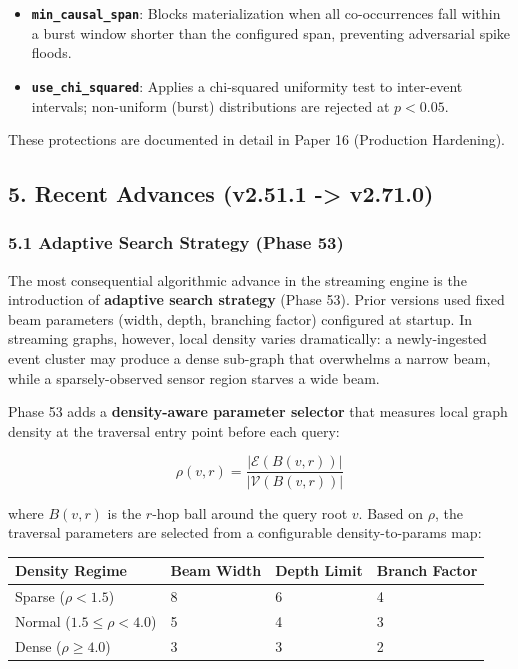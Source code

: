 \begin{itemize}
  \item \textbf{\texttt{min\_causal\_span}}: Blocks materialization when all co-occurrences fall within a burst window shorter than the configured span, preventing adversarial spike floods.
  \item \textbf{\texttt{use\_chi\_squared}}: Applies a chi-squared uniformity test to inter-event intervals; non-uniform (burst) distributions are rejected at $p < 0.05$.
\end{itemize}


These protections are documented in detail in Paper 16 (Production Hardening).

\subsection*{5. Recent Advances (v2.51.1 -> v2.71.0)}

\subsubsection*{5.1 Adaptive Search Strategy (Phase 53)}
The most consequential algorithmic advance in the streaming engine is the introduction of \textbf{adaptive search strategy} (Phase 53). Prior versions used fixed beam parameters (width, depth, branching factor) configured at startup. In streaming graphs, however, local density varies dramatically: a newly-ingested event cluster may produce a dense sub-graph that overwhelms a narrow beam, while a sparsely-observed sensor region starves a wide beam.

Phase 53 adds a \textbf{density-aware parameter selector} that measures local graph density at the traversal entry point before each query:

$$\rho(v, r) = \frac{|\mathcal{E}(B(v,r))|}{|\mathcal{V}(B(v,r))|}$$

where $B(v, r)$ is the $r$-hop ball around the query root $v$. Based on $\rho$, the traversal parameters are selected from a configurable density-to-params map:

\begin{table}[h]
\small\centering
\begin{tabular}{llll}
\toprule
Density Regime & Beam Width & Depth Limit & Branch Factor \\
\midrule
Sparse ($\rho < 1.5$) & 8 & 6 & 4 \\
Normal ($1.5 \leq \rho < 4.0$) & 5 & 4 & 3 \\
Dense ($\rho \geq 4.0$) & 3 & 3 & 2 \\
\bottomrule
\end{tabular}
\end{table}


